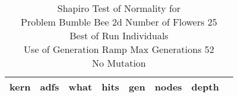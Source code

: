 \begin{table}[H]
\caption{Shapiro Test of Normality for \\ Problem  Bumble Bee 2d  Number of Flowers 25\\Best of Run Individuals \\ Use of Generation Ramp  Max Generations 52\\ No Mutation \\}
\begin{center}
\scalebox{0.8} %
{
\begin{tabular}{lrrrrrrr}
\hline
kern & adfs & what & hits & gen & nodes & depth \\
\hline


\end{tabular}
}
\end{center}
\end{table}

